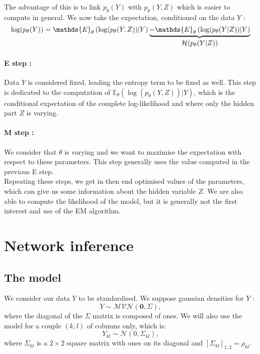 \documentclass[a4paper,11pt]{article}
\begin{document}
The advantage of this is to link $p_\theta(Y)$ with $p_\theta (Y,Z)$ which is easier to compute in general. We now take the expectation,
conditioned on the data $Y$ :
\[ \log(p_\theta (Y) )= \mathds{E}_\theta \left(\log(p_\theta (Y,Z))|Y \right) \underbrace{- \mathds{E}_\theta \left(\log(p_\theta (Y|Z))|Y \right)}_{\text{\normalsize{$\mathcal{H}(p_\theta (Y|Z))$}}} \]

\paragraph{E step :}
Data $Y$ is considered fixed, leading the entropy term to be fixed as well. This step is dedicated to the computation of 
$\mathds{E}_\theta \left(\log(p_\theta (Y,Z))|Y \right)$, which is the conditional expectation of the complete log-likelihood and 
where only the hidden part $Z$ is varying. \\

\paragraph{M step :}
We consider that  $\theta$ is varying and we want to maximise the expectation with respect to these parameters. This step generally uses 
the value computed in the previous E step.\\

Repeating these steps, we get in then end optimised values of the parameters, which can give us some information about the hidden variable $Z$. 
We are also able to compute the likelihood of the model, but it is generally not the first interest and use of the EM algorithm.

\section{Network inference}
  \subsection{The model}
  We consider our data $Y$ to be standardised. We suppose gaussian densities for $Y$ :
  \[Y \sim \mathcal{MVN}(\mathbf{0},\Sigma),\]
  where the diagonal of the $\Sigma$ matrix is composed of ones. We will also use the model for a couple $(k,l)$ of columns only, which is:
  \[Y_{kl}\sim\mathcal{N}(0,\Sigma_{kl}),\]
  where $ \Sigma_{kl}$ is a $2\times 2$ square matrix with ones on its diagonal and $[\Sigma_{kl}]_{1,2} = \rho_{kl}$.\\
  
\end{document}
